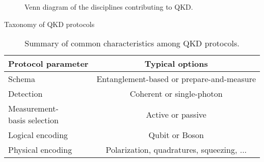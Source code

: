 \documentclass[aspectratio=169]{beamer}
\begin{document}
	\begin{frame}
		\begin{figure}
			\caption{Venn diagram of the disciplines contributing to QKD.}
		\end{figure}
	\end{frame}
	
	\begin{frame}{Taxonomy of QKD protocols}
		\begin{table}
			\caption{Summary of common characteristics among QKD protocols.}
			\begin{tabular}{lc}
				\toprule
				Protocol parameter & Typical options \\
				\midrule
				Schema & Entanglement-based or prepare-and-measure \\
				Detection & Coherent or single-photon \\
				\makecell[l]{Measurement-\\basis selection} & Active or passive \\
				Logical encoding & Qubit or Boson \\
				Physical encoding & Polarization, quadratures, squeezing, ... \\
				\bottomrule
			\end{tabular}
		\end{table}
	\end{frame}
	
\end{document}
